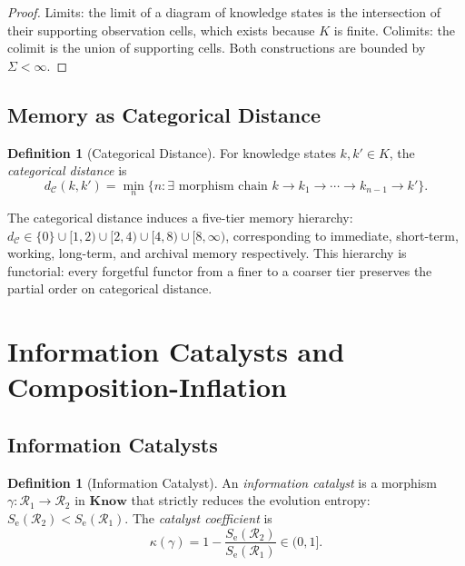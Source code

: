 \documentclass[twocolumn,11pt,a4paper]{article}
\theoremstyle{plain}
\theoremstyle{definition}
\newtheorem{definition}[theorem]{Definition}
\theoremstyle{remark}
\newcommand{\Se}{S_{\mathrm{e}}}
\begin{document}
\begin{proof}
Limits: the limit of a diagram of knowledge states is the intersection of their supporting observation cells, which exists because $K$ is finite.  Colimits: the colimit is the union of supporting cells.  Both constructions are bounded by $\Sigma < \infty$.
\end{proof}

\subsection{Memory as Categorical Distance}

\begin{definition}[Categorical Distance]
\label{def:catdist}
For knowledge states $k, k' \in K$, the \emph{categorical distance} is
\begin{equation}
  d_{\mathcal{C}}(k,k') = \min_{n}\{n : \exists \text{ morphism chain } k \to k_1 \to \cdots \to k_{n-1} \to k'\}.
\end{equation}
\end{definition}

The categorical distance induces a five-tier memory hierarchy:
$d_{\mathcal{C}} \in \{0\} \cup [1,2) \cup [2,4) \cup [4,8) \cup [8,\infty)$, corresponding to immediate, short-term, working, long-term, and archival memory respectively.  This hierarchy is functorial: every forgetful functor from a finer to a coarser tier preserves the partial order on categorical distance.

\section{Information Catalysts and Composition-Inflation}
\label{sec:catalysts}

\subsection{Information Catalysts}

\begin{definition}[Information Catalyst]
\label{def:catalyst}
An \emph{information catalyst} is a morphism $\gamma : \mathcal{R}_1 \to \mathcal{R}_2$ in $\mathbf{Know}$ that strictly reduces the evolution entropy: $\Se(\mathcal{R}_2) < \Se(\mathcal{R}_1)$.  The \emph{catalyst coefficient} is
\begin{equation}
  \kappa(\gamma) = 1 - \frac{\Se(\mathcal{R}_2)}{\Se(\mathcal{R}_1)} \in (0,1].
\end{equation}
\end{definition}
\end{document}
